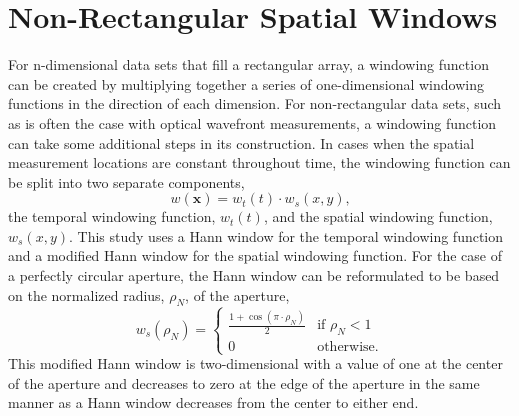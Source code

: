 \section{Non-Rectangular Spatial Windows}
For n-dimensional data sets that fill a rectangular array, a windowing function can be created by multiplying together a series of one-dimensional windowing functions in the direction of each dimension.
For non-rectangular data sets, such as is often the case with optical wavefront measurements, a windowing function can take some additional steps in its construction.
In cases when the spatial measurement locations are constant throughout time, the windowing function can be split into two separate components,
\begin{equation}
 w(\mathbf{x}) = w_t(t)\cdot w_s(x,y) \textrm{,}
 \label{eqn:04_window_sep}
\end{equation}
the temporal windowing function, $w_t(t)$, and the spatial windowing function, $w_s(x,y)$.
This study uses a Hann window for the temporal windowing function and a modified Hann window for the spatial windowing function.
For the case of a perfectly circular aperture, the Hann window can be reformulated to be based on the normalized radius, $\rho_N$, of the aperture,
\begin{equation}
 w_s(\rho_N) =
 \begin{cases}
  \frac{1+\cos(\pi\cdot\rho_N)}{2} & \textrm{if } \rho_N < 1 \\
  0                                & \textrm{otherwise.}
 \end{cases}
 \label{eqn:04_window_space}
\end{equation}
This modified Hann window is two-dimensional with a value of one at the center of the aperture and decreases to zero at the edge of the aperture in the same manner as a Hann window decreases from the center to either end.

